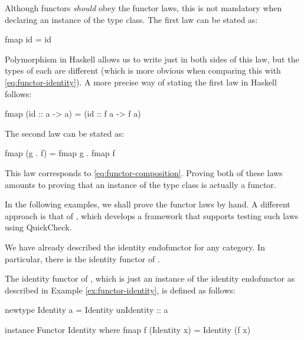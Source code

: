Although functors \emph{should} obey the functor laws, this is not
mandatory when declaring an instance of the  type
class. The first law can be stated as:
\begin{codehaskell}
fmap id = id
\end{codehaskell}
Polymorphism in Haskell allows us to write just  in
both sides of this law, but the types of each  are
different (which is more obvious when comparing this with
\eqref{eq:functor-identity}). A more precise way of stating the first
law in Haskell follows:
\begin{codehaskell}
fmap (id :: a -> a) = (id :: f a -> f a)
\end{codehaskell}
The second law can be stated as:
\begin{codehaskell}
fmap (g . f) = fmap g . fmap f
\end{codehaskell}
This law corresponds to \eqref{eq:functor-composition}. Proving both
of these laws amounts to proving that an instance of the
 type class is actually a functor.

\begin{remark}

  In the following examples, we shall prove the functor laws by hand.
  A different approach is that of \parencite{jeuring-2012}, which
  develops a framework that supports testing such laws using
  QuickCheck.

\end{remark}

We have already described the identity endofunctor for any category.
In particular, there is the identity functor of \hask.

\begin{example}
  \label{ex:functor-identity-haskell}

  The identity functor of \hask, which is just an instance of the
  identity endofunctor as described in Example
  \ref{ex:functor-identity}, is defined as follows:
  \begin{codehaskell}
newtype Identity a = Identity {unIdentity :: a}

instance Functor Identity where
  fmap f (Identity x) = Identity (f x)
  \end{codehaskell}


\end{example}


